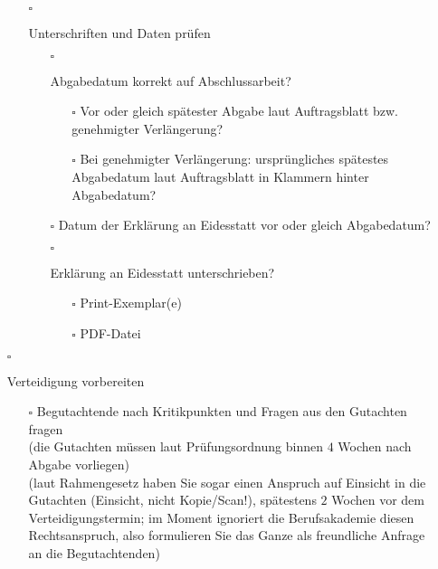 \begin{itemize}
{\begin{itemize}
{\begin{itemize}
{                    }
                \end{itemize}
            }
            \item[$\square$]{
                Unterschriften und Daten prüfen
                \begin{itemize}
                    \item[$\square$]{
                        Abgabedatum korrekt auf Abschlussarbeit?
                        \begin{itemize}
                            \item[$\square$] Vor oder gleich spätester Abgabe laut Auftragsblatt bzw. genehmigter Verlängerung?
                            \item[$\square$] Bei genehmigter Verlängerung: ursprüngliches spätestes Abgabedatum laut Auftragsblatt in Klammern hinter Abgabedatum?
                        \end{itemize}
                    }
                    \item[$\square$] Datum der Erklärung an Eidesstatt vor oder gleich Abgabedatum?
                    \item[$\square$]{
                        Erklärung an Eidesstatt unterschrieben?
                        \begin{itemize}
                            \item[$\square$] Print-Exemplar(e)
                            \item[$\square$] PDF-Datei
                        \end{itemize}
                    }
                \end{itemize}
            }
        \end{itemize}
    }
    \item[$\square$]{
        Verteidigung vorbereiten
        \begin{itemize}
            \item[$\square$]{
                Begutachtende nach Kritikpunkten und Fragen aus den Gutachten fragen\\
                (die Gutachten müssen laut Prüfungsordnung binnen $4$ Wochen nach Abgabe vorliegen)\\
                (laut Rahmengesetz haben Sie sogar einen Anspruch auf Einsicht in die Gutachten (Einsicht, nicht Kopie/Scan!), spätestens $2$ Wochen vor dem Verteidigungstermin; im Moment ignoriert die Berufsakademie diesen Rechtsanspruch, also formulieren Sie das Ganze als freundliche Anfrage an die Begutachtenden)
}
\end{itemize}}
\end{itemize}
